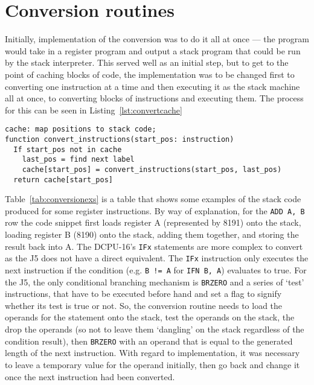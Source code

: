 \section{Conversion routines}

Initially, implementation of the conversion was to do it all at once --- the
program would take in a register program and output a stack program that could
be run by the stack interpreter. This served well as an initial step, but to get
to the point of caching blocks of code, the implementation was to be changed
first to converting one instruction at a time and then executing it as the stack
machine all at once, to converting blocks of instructions and executing them.
The process for this can be seen in Listing~\ref{lst:convertcache}

\begin{lstlisting}[label={lst:convertcache},caption={Converted instruction
caching},float]
cache: map positions to stack code;
function convert_instructions(start_pos: instruction)
  If start_pos not in cache
    last_pos = find next label
    cache[start_pos] = convert_instructions(start_pos, last_pos)
  return cache[start_pos]
\end{lstlisting}

Table~\ref{tab:conversionexs} is a table that shows some examples of the stack
code produced for some register instructions. By way of explanation, for the
\texttt{ADD A, B} row the code snippet first loads register A (represented by
8191) onto the stack, loading register B (8190) onto the stack, adding them
together, and storing the result back into A. The DCPU-16's \texttt{IFx}
statements are more complex to convert as the J5 does not have a direct
equivalent. The \texttt{IFx} instruction only executes the next instruction if
the condition (e.g. \texttt{B != A} for \texttt{IFN B, A}) evaluates to true.
For the J5, the only conditional branching mechanism is \texttt{BRZERO} and a
series of `test' instructions, that have to be executed before hand and set a
flag to signify whether its test is true or not. So, the conversion routine
needs to load the operands for the statement onto the stack, test the operands
on the stack, the drop the operands (so not to leave them `dangling' on the
stack regardless of the condition result), then \texttt{BRZERO} with an operand
that is equal to the generated length of the next instruction. With regard to
implementation, it was necessary to leave a temporary value for the operand
initially, then go back and change it once the next instruction had been
converted.

